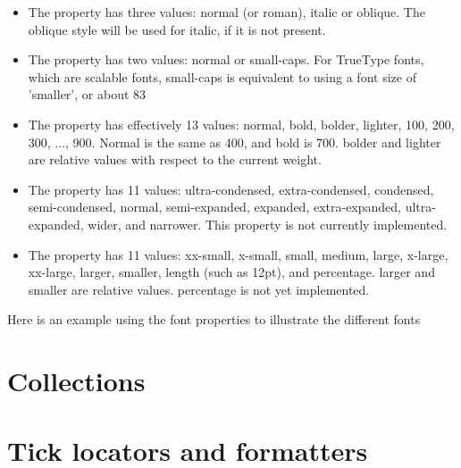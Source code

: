 \documentclass[twoside]{book}
\begin{document}
\begin{itemize}
\item The  property has three values: normal (or
  roman), italic or oblique.  The oblique style will be used for
  italic, if it is not present.
  
\item The  property has two values: normal or
  small-caps.  For TrueType fonts, which are scalable fonts,
  small-caps is equivalent to
  using a font size of 'smaller', or about 83%
  
\item The  property has effectively 13 values: normal,
  bold, bolder, lighter, 100, 200, 300, ..., 900.  Normal is the same
  as 400, and bold is 700.  bolder and lighter are relative values
  with respect to the current weight.

  
\item The  property has 11 values: ultra-condensed,
  extra-condensed, condensed, semi-condensed, normal, semi-expanded,
  expanded, extra-expanded, ultra-expanded, wider, and narrower.  This
  property is not currently implemented.
  
\item The  property has 11 values: xx-small, x-small,
  small, medium, large, x-large, xx-large, larger, smaller, length
  (such as 12pt), and percentage.  larger and smaller are relative
  values.  percentage is not yet implemented.

\end{itemize}

Here is an example using the font properties to illustrate the
different fonts








\chapter{Collections}
\label{cha:collections}


\chapter{Tick locators and formatters}
\label{cha:tickers}
\end{document}
